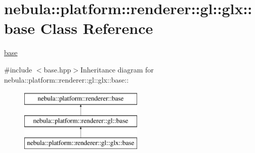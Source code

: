 \hypertarget{classnebula_1_1platform_1_1renderer_1_1gl_1_1glx_1_1base}{
\section{nebula::platform::renderer::gl::glx::base Class Reference}
\label{classnebula_1_1platform_1_1renderer_1_1gl_1_1glx_1_1base}
}


\hyperlink{classnebula_1_1platform_1_1renderer_1_1gl_1_1glx_1_1base}{base}  


{\ttfamily \#include $<$base.hpp$>$}Inheritance diagram for nebula::platform::renderer::gl::glx::base::\begin{figure}[H]
\begin{center}
\leavevmode
\includegraphics[height=3cm]{classnebula_1_1platform_1_1renderer_1_1gl_1_1glx_1_1base}
\end{center}
\end{figure}
